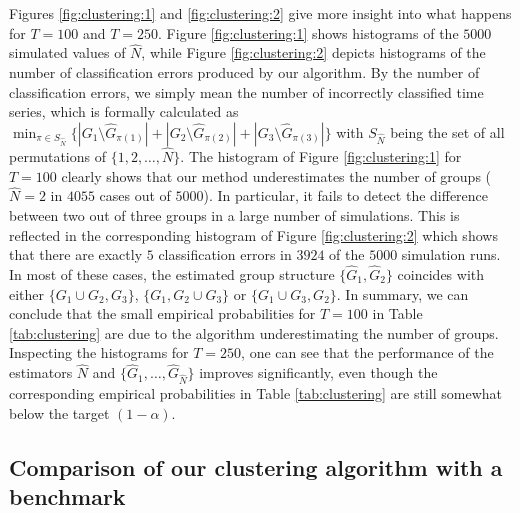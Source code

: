 \documentclass[12pt]{article}
\begin{document}
{\color{red}Figures \ref{fig:clustering:1} and \ref{fig:clustering:2} give more insight into what happens for $T=100$ and $T=250$.} Figure \ref{fig:clustering:1} shows histograms of the $5000$ simulated values of $\widehat{N}$, while Figure \ref{fig:clustering:2} depicts histograms of the number of classification errors produced by our algorithm. By the number of classification errors, we simply mean the number of incorrectly classified time series, which is formally calculated as 
$\min_{\pi \in S_{\widehat{N}}} \big\{ |G_1 \setminus \widehat{G}_{\pi(1)}| +|G_2 \setminus \widehat{G}_{\pi(2)}| + |G_3 \setminus \widehat{G}_{\pi(3)}| \big\}$
with $S_{\widehat{N}}$ being the set of all permutations of $\{1, 2, \ldots, \widehat{N}\}$. {\color{red}The histogram of Figure \ref{fig:clustering:1} for $T=100$ clearly shows that our method underestimates the number of groups ($\widehat{N} = 2$ in $4055$ cases out of $5000$). In particular, it fails to detect the difference between two out of three groups in a large number of simulations. This is reflected in the corresponding histogram of Figure \ref{fig:clustering:2} which shows that there are exactly $5$ classification errors in $3924$ of the $5000$ simulation runs. In most of these cases, the estimated group structure $\{ \widehat{G}_1, \widehat{G}_{2}\}$ coincides with either $\{ G_1 \cup G_2,G_3\}$,  $\{ G_1, G_2\cup G_3\}$ or $ \{ G_1 \cup G_3,G_2\}$. In summary, we can conclude that the small empirical probabilities for $T=100$ in Table \ref{tab:clustering} are due to the algorithm underestimating the number of groups. Inspecting the histograms for $T=250$, one can see that the performance of the estimators $\widehat{N}$ and $\{ \widehat{G}_1,\ldots, \widehat{G}_{\widehat{N}} \}$ improves significantly, even though the corresponding empirical probabilities in Table \ref{tab:clustering} are still somewhat below the target $(1-\alpha)$.}


\subsection{Comparison of our clustering algorithm with a benchmark}
\end{document}
